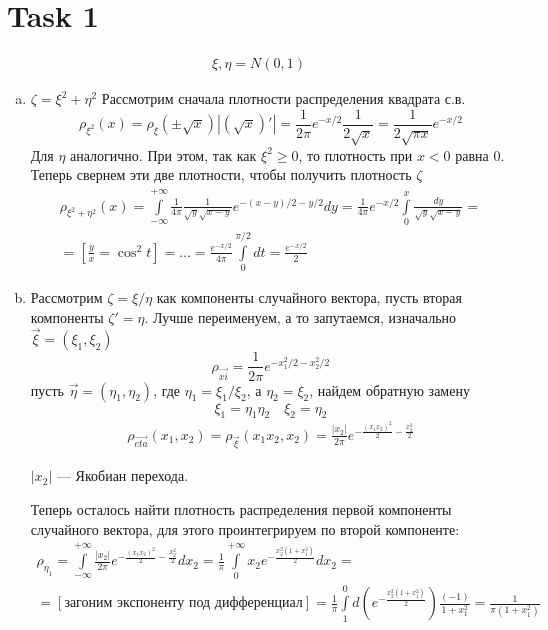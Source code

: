 \section{Task 1}
\begin{gather}
    \xi, \eta = N(0,1)
\end{gather}
\begin{enumerate}[a)]
    \item $\zeta = \xi^2 + \eta^2$
    Рассмотрим сначала плотности распределения квадрата с.в.
    \begin{equation}
        \rho_{\xi^2}(x) = \rho_{\xi}(\pm\sqrt{x})\left|\left(\sqrt{x}\right)'\right| = \frac{1}{2\pi} e^{-x/2}\frac{1}{2\sqrt{x}} = \frac{1}{2\sqrt{\pi x}}e^{-x/2}
    \end{equation}
    Для $\eta$ аналогично.
    При этом, так как $\xi^2 \geq 0$, то плотность при $x < 0$ равна 0.
    Теперь свернем эти две плотности, чтобы получить плотность $\zeta$
    \begin{gather}
        \rho_{\xi^2+\eta^2}(x) = \int\limits_{-\infty}^{+\infty}\frac{1}{4\pi}\frac{1}{\sqrt{y}\sqrt{x-y}}e^{-(x-y)/2-y/2}dy=\frac{1}{4\pi}e^{-x/2}\int\limits_{0}^{x}\frac{dy}{\sqrt{y}\sqrt{x-y}} = \\
        = \left[\frac{y}{x} = \cos^2t\right] = \ldots = \frac{e^{-x/2}}{4\pi}\int\limits^{\pi/2}_{0}dt = \frac{e^{-x/2}}{2}
    \end{gather}
    \item Рассмотрим $\zeta = \xi/\eta$ как компоненты случайного вектора, пусть вторая компоненты $\zeta' = \eta$. Лучше переименуем, а то запутаемся, изначально $\vec{\xi} = (\xi_1, \xi_2)$
    \begin{equation}
        \rho_{\vec{xi}} = \frac{1}{2\pi}e^{-x_1^2/2-x_2^2/2}
    \end{equation}
    пусть $\vec{\eta} = (\eta_1, \eta_2)$, где $\eta_1 = \xi_1/\xi_2$, а $\eta_2 = \xi_2$, найдем обратную замену
    \begin{equation}
        \xi_1 = \eta_1 \eta_2 \quad \xi_2 = \eta_2
    \end{equation}
    \begin{gather}
        \rho_{\vec{eta}}(x_1, x_2) = \rho_{\vec{\xi}}(x_1x_2,x_2) = \frac{|x_2|}{2\pi}e^{-\frac{(x_1x_2)^2}{2}-\frac{x_2^2}{2}}
    \end{gather}
    \begin{remark}
        $|x_2|$ --- Якобиан перехода.
    \end{remark}
    Теперь осталось найти плотность распределения первой компоненты случайного вектора, для этого проинтегрируем по второй компоненте:
    \begin{gather}
        \rho_{\eta_1} = \int\limits_{-\infty}^{+\infty} \frac{|x_2|}{2\pi}e^{-\frac{(x_1x_2)^2}{2}-\frac{x_2^2}{2}}dx_2 = \frac{1}{\pi}\int\limits_{0}^{+\infty}x_2e^{-\frac{x_2^2(1+x_1^2)}{2}}dx_2 = \\ 
        = [\text{загоним экспоненту под дифференциал}] = \frac{1}{\pi}\int\limits_{1}^{0}d\left(e^{-\frac{x_2^2(1+x_1^2)}{2}}\right)\frac{(-1)}{1+x_1^2} = \frac{1}{\pi(1+x_1^2)}
    \end{gather}
\end{enumerate}
